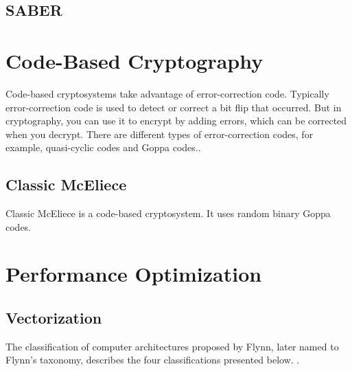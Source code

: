 \subsection{SABER}


\section{Code-Based Cryptography}
Code-based cryptosystems take advantage of error-correction code. Typically error-correction code is used to detect or correct a bit flip that occurred. But in cryptography, you can use it to encrypt by adding errors, which can be corrected when you decrypt\cite{bernstein2017}. There are different types of error-correction codes, for example, quasi-cyclic codes and Goppa codes.\cite{sendrier2011}.

\subsection{Classic McEliece}
Classic McEliece is a code-based cryptosystem. It uses random binary Goppa codes.




\section{Performance Optimization}


\subsection{Vectorization}

The classification of computer architectures proposed by Flynn, later named to Flynn's taxonomy, describes the four classifications presented below. \cite{flynn1972}.

